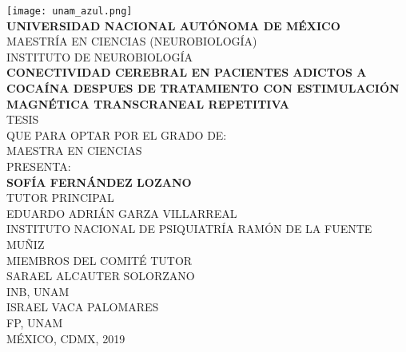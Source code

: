 \begin{titlepage}
    \begin{center}
        \texttt{[image: unam\_azul.png]}\\
        \textbf{UNIVERSIDAD NACIONAL AUTÓNOMA DE MÉXICO}\\
        MAESTRÍA EN CIENCIAS (NEUROBIOLOGÍA)\\
        INSTITUTO DE NEUROBIOLOGÍA\\
        \vspace{13mm}
        \large
        \textbf{CONECTIVIDAD CEREBRAL EN PACIENTES ADICTOS A COCAÍNA DESPUES DE TRATAMIENTO CON ESTIMULACIÓN MAGNÉTICA TRANSCRANEAL REPETITIVA}\\
        \vspace{15mm}
        \large
        TESIS\\
        \normalsize
        QUE PARA OPTAR POR EL GRADO DE:\\
        MAESTRA EN CIENCIAS\\
        \vspace{13mm}
        PRESENTA:\\
        \large
        \textbf{SOFÍA FERNÁNDEZ LOZANO}\\
        \vfill
        \normalsize
        TUTOR PRINCIPAL\\
        EDUARDO ADRIÁN GARZA VILLARREAL\\
        INSTITUTO NACIONAL DE PSIQUIATRÍA RAMÓN DE LA FUENTE MUÑIZ\\
        \vspace{3mm}
        MIEMBROS DEL COMITÉ TUTOR\\
        SARAEL ALCAUTER SOLORZANO\\
        INB, UNAM\\
        \vspace{1mm}
        ISRAEL VACA PALOMARES\\
        FP, UNAM\\
        \vspace{5mm}
        MÉXICO, CDMX, 2019
    \end{center}
\end{titlepage}
